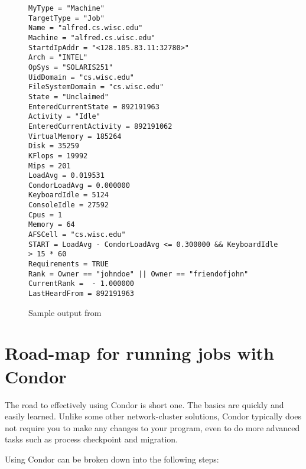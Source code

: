 %
%
%
\begin{center}
\begin{figure}
\CondorVerySmall
\begin{verbatim}
MyType = "Machine"
TargetType = "Job"
Name = "alfred.cs.wisc.edu"
Machine = "alfred.cs.wisc.edu"
StartdIpAddr = "<128.105.83.11:32780>"
Arch = "INTEL"
OpSys = "SOLARIS251"
UidDomain = "cs.wisc.edu"
FileSystemDomain = "cs.wisc.edu"
State = "Unclaimed"
EnteredCurrentState = 892191963
Activity = "Idle"
EnteredCurrentActivity = 892191062
VirtualMemory = 185264
Disk = 35259
KFlops = 19992
Mips = 201
LoadAvg = 0.019531
CondorLoadAvg = 0.000000
KeyboardIdle = 5124
ConsoleIdle = 27592
Cpus = 1
Memory = 64
AFSCell = "cs.wisc.edu"
START = LoadAvg - CondorLoadAvg <= 0.300000 && KeyboardIdle > 15 * 60
Requirements = TRUE
Rank = Owner == "johndoe" || Owner == "friendofjohn" 
CurrentRank =  - 1.000000
LastHeardFrom = 892191963
\end{verbatim}
\normalsize
\caption{\label{fig:CondorStatusL}Sample output from }
\end{figure}
\end{center}


\section{Road-map for running jobs with Condor}

The road to effectively using Condor is short one.  The basics
are quickly and easily learned.  Unlike some other network-cluster
solutions, Condor typically does not require you to make any
changes to your program, even to do more advanced tasks such as
process checkpoint and migration. 

Using Condor can be broken down into the following steps:

